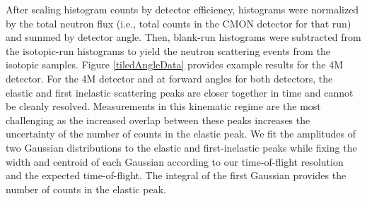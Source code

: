 %

After scaling histogram counts by detector efficiency, histograms were
normalized by the total neutron flux
(i.e., total counts in the CMON detector for that run) and summed by detector
angle. Then, blank-run histograms
were subtracted from the isotopic-run histograms to yield the neutron scattering
events from the isotopic samples. Figure \ref{tiledAngleData} provides example 
results for the 4M detector.
For the 4M detector and at forward angles for both detectors, the elastic and first 
inelastic scattering peaks are closer together in time and cannot be cleanly resolved.
Measurements in this
kinematic regime are the most challenging as the increased overlap between
these peaks increases the uncertainty of the number of counts in the elastic
peak. We fit the amplitudes of two Gaussian distributions to the elastic and
first-inelastic peaks while fixing
the width and centroid of each Gaussian according to our time-of-flight resolution and
the expected time-of-flight. The integral of the first Gaussian provides the
number of counts in the elastic peak.

